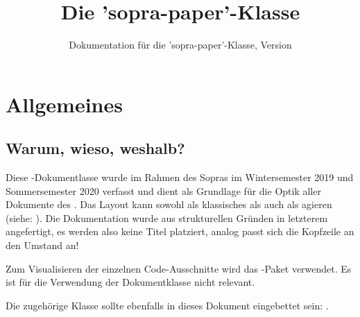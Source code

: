 \documentclass[useartcl,notoc]{sopra-paper}
\title{Die 'sopra-paper'-Klasse}
\subtitle[Dokumentation für die 'sopra-paper'-Klasse]{Dokumentation für die 'sopra-paper'-Klasse, Version \thesopversion}
\begin{document}
%
%
%
%

\section{Allgemeines}
\subsection{Warum, wieso, weshalb?}
    Diese \LaTeXe-Dokumentlasse wurde im Rahmen des Sopras im
    Wintersemester 2019 und Sommersemester 2020 verfasst und dient als
    Grundlage für die Optik aller Dokumente des .
    Das Layout kann sowohl als klassisches  als auch als  agieren (siehe: ). Die Dokumentation wurde aus strukturellen Gründen in letzterem angefertigt, es werden also keine Titel platziert, analog passt sich die Kopfzeile an den Umstand an!\par
    Zum Visualisieren der einzelnen Code-Ausschnitte wird das
    -Paket verwendet. Es ist für die Verwendung der Dokumentklasse
    nicht relevant.\par
    Die zugehörige Klasse sollte ebenfalls in dieses Dokument eingebettet sein: .
\end{document}
